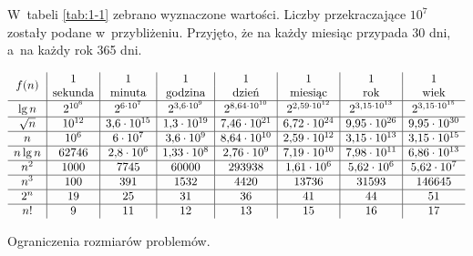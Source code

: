 W~tabeli \ref{tab:1-1} zebrano wyznaczone wartości.
Liczby przekraczające $10^7$ zostały podane w~przybliżeniu.
Przyjęto, że na każdy miesiąc przypada 30 dni, a~na każdy rok 365 dni.

\begin{table}[ht]
	\centering
		\[
			\begin{array}{c|c|c|c|c|c|c|c}
				&1&1&1&1&1&1&1 \\
				\raisebox{1.5ex}[0cm][0cm]{$f(n)$} & \text{sekunda} & \text{minuta} & \text{godzina} & \text{dzień} & \text{miesiąc} & \text{rok} & \text{wiek} \\
				\hline
				\lg n & 2^{10^6} & 2^{6\cdot10^7} & 2^{3{,}6\cdot10^9} & 2^{8{,}64\cdot10^{10}} & 2^{2{,}59\cdot10^{12}} & 2^{3{,}15\cdot10^{13}} & 2^{3{,}15\cdot10^{15}} \\
				\hline
				\sqrt{n} & 10^{12} & 3{,}6\cdot10^{15} & 1{,}3\cdot10^{19} & 7{,}46\cdot10^{21} & 6{,}72\cdot10^{24} & 9{,}95\cdot10^{26} & 9{,}95\cdot10^{30} \\
				\hline
				n & 10^6 & 6\cdot10^7 & 3{,}6\cdot10^9 & 8{,}64\cdot10^{10} & 2{,}59\cdot10^{12} & 3{,}15\cdot10^{13} & 3{,}15\cdot10^{15} \\
				\hline
				n\lg n & 62746 & 2{,}8\cdot10^6 & 1{,}33\cdot10^8 & 2{,}76\cdot10^9 & 7{,}19\cdot10^{10} & 7{,}98\cdot10^{11} & 6{,}86\cdot10^{13} \\
				\hline
				n^2 & 1000 & 7745 & 60000 & 293938 & 1{,}61\cdot10^6 & 5{,}62\cdot10^6 & 5{,}62\cdot10^7 \\
				\hline
				n^3 & 100 & 391 & 1532 & 4420 & 13736 & 31593 & 146645 \\
				\hline
				2^n & 19 & 25 & 31 & 36 & 41 & 44 & 51 \\
				\hline
				n! & 9 & 11 & 12 & 13 & 15 & 16 & 17
			\end{array}
		\]
	\caption{Ograniczenia rozmiarów problemów.} \label{tab:1-1}
\end{table}
